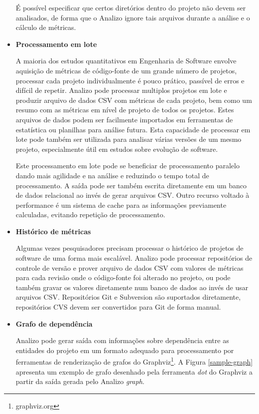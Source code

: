 \begin{itemize}
\begin{itemize}
\end{itemize}

É possível especificar que certos diretórios dentro do projeto não devem ser
analisados, de forma que o Analizo ignore tais arquivos durante a análise e o
cálculo de métricas.

\item {\bf Processamento em lote}\label{lote}

A maioria dos estudos quantitativos em Engenharia de Software envolve aquisição
de métricas de código-fonte de um grande número de projetos, processar cada
projeto individualmente é pouco prático, passível de erros e difícil de
repetir. Analizo pode processar multiplos projetos em lote e produzir arquivo
de dados CSV com métricas de cada projeto, bem como um resumo com as métricas
em nível de projeto de todos os projetos. Estes arquivos de dados podem ser
facilmente importados em ferramentas de estatística ou planilhas para análise
futura. Esta capacidade de processar em lote pode também ser utilizada para
analisar várias versões de um mesmo projeto, especialmente útil em estudos
sobre evolução de software.

Este processamento em lote pode se beneficiar de processamento paralelo dando
mais agilidade e na análise e reduzindo o tempo total de processamento.  A
saída pode ser também escrita diretamente em um banco de dados relacional ao
invés de gerar arquivos CSV. Outro recurso voltado à performance é um sistema
de cache para as informações previamente calculadas, evitando repetição de
processamento.

\item {\bf Histórico de métricas}

Algumas vezes pesquisadores precisam processar o histórico de projetos de
software de uma forma mais escalável. Analizo pode processar repositórios de
controle de versão e prover arquivo de dados CSV com valores de métricas para
cada revisão onde o código-fonte foi alterado no projeto, ou pode também gravar
os valores diretamente num banco de dados ao invés de usar arquivos CSV. Repositórios Git e
Subversion são suportados diretamente, repositórios CVS devem ser convertidos
para Git de forma manual.

\item {\bf Grafo de dependência}

Analizo pode gerar saída com informações sobre dependência entre as entidades
do projeto em um formato adequado para processamento por ferramentas de
renderização de grafos do Graphviz\footnote{graphviz.org}. A Figura
\ref{sample-graph} apresenta um exemplo de grafo desenhado pela ferramenta {\it
dot} do Graphviz a partir da saída gerada pelo Analizo {\it graph}.


\end{itemize}
